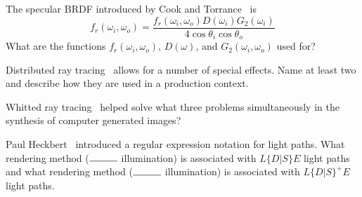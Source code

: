 \documentclass{exam}
\begin{document}
\begin{questions}
\answer %


\question[10] The specular BRDF introduced by Cook and Torrance~\cite{Cook:1982:RMC:357290.357293} is
\begin{equation}
    f_r(\omega_i, \omega_o) = \frac{f_r(\omega_i, \omega_o) D(\omega_i) G_2(\omega_i)}{4 \cos \theta_i \cos \theta_o}
\end{equation}
What are the functions $f_r(\omega_i, \omega_o)$, $D(\omega)$, and $G_2(\omega_i, \omega_o)$ used for?

\answer %


\question[10] Distributed ray tracing~\cite{Cook:1984:DRT:964965.808590} allows for a number of special effects. Name at least two and describe how they are used in a production context.

\answer %


\question[10] Whitted ray tracing~\cite{Whitted:1980:IIM:358876.358882} helped solve what three problems simultaneously in the synthesis of computer generated images?

\answer %


\question[10] Paul Heckbert~\cite{Heckbert:1990:ART:97880.97895} introduced a regular expression notation for light paths. What rendering method ($\rule{1cm}{0.15mm}$ illumination) is associated with $L\{D|S\}E$ light paths and what rendering method ($\rule{1cm}{0.15mm}$ illumination) is associated with $L\{D|S\}^+E$ light paths.

\answer %


\end{questions}



\end{document}
